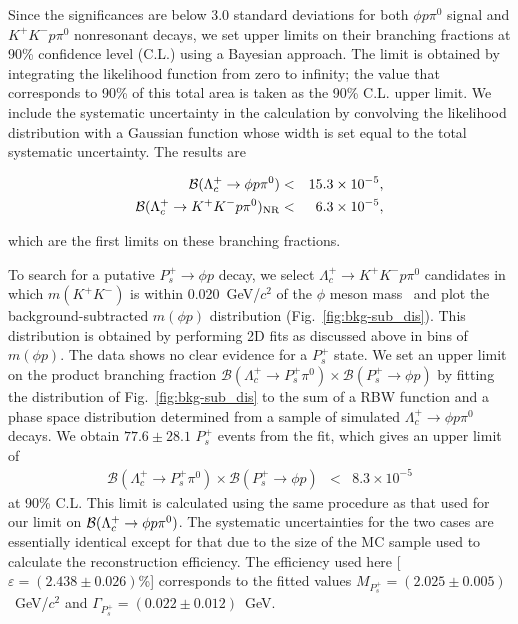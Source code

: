 \documentclass[aps,prl,twocolumn,superscriptaddress,showpacs,preprintnumbers,amsmath,amssymb]{revtex4-1}
\begin{document}
Since the significances are below 3.0 standard deviations for both $\phi p\pi^0$ signal and $K^+K^-p\pi^0$ nonresonant decays, we set upper limits on their branching fractions  at 90\% confidence level (C.L.) using a Bayesian approach. The limit is obtained by integrating the
likelihood function from zero to infinity; the value that
corresponds to 90\% of this total area is taken as the
90\% C.L. upper limit.  We include the systematic uncertainty  in the calculation by
convolving the likelihood distribution with a Gaussian function
whose width is set equal to the total systematic uncertainty. %
The results are
\begin{linenomath}
\begin{eqnarray*}
\mathcal{B}(\Lambda_c^+\to \phi p\pi^0) &<& 15.3\times10^{-5} ,\\
\mathcal{B}(\Lambda_c^+\to K^+K^-p\pi^0)_{\rm NR} &<&6.3\times10^{-5} ,
\end{eqnarray*}
\end{linenomath}
which are the first limits on these branching fractions. 

To search for a putative $P_s^+\to\phi p$ decay, we select $\Lambda_c^+\to K^+K^-p\pi^0$ candidates in which $m(K^+K^-)$ is within 0.020~GeV/$c^2$ of the   $\phi$ meson mass~\cite{PDG} 
and plot the  background-subtracted $m(\phi p)$ distribution (Fig.~\ref{fig:bkg-sub_dis}). This distribution is obtained by performing 2D fits as discussed above in bins of $m(\phi p)$. %
The data shows no clear evidence for a $P_s^+$ state. 
We set an upper limit on the product branching fraction 
$\mathcal{B}(\Lambda_c^+\to P_s^+\pi^0) \times \mathcal{B}(P_s^+\to \phi p)$ by fitting the  distribution of Fig.~\ref{fig:bkg-sub_dis}
to the sum of a RBW function and a phase space 
distribution determined from a sample of simulated $\Lambda^+_c\to\phi p\pi^0$ 
decays. We obtain $77.6\pm28.1$ $P_s^+$ events from the fit, which gives an upper limit of 
\begin{eqnarray*}
\mathcal{B}(\Lambda_c^+\to P_s^+\pi^0) \times 
\mathcal{B}(P_s^+\to \phi p) & < & 8.3\times 10^{-5}
\end{eqnarray*}
at 90\% C.L. This limit is calculated using the same procedure as that used for our limit on ${\cal B}(\Lambda_c^+\rightarrow \phi p \pi^0)$. The
systematic uncertainties for the two cases are essentially 
identical except for that due to the size of the MC sample 
used to calculate the reconstruction efficiency.
The  efficiency used here
[$\varepsilon=(2.438\pm 0.026)$\%] 
corresponds to the fitted values
$M_{P_s^+}=(2.025\pm 0.005)$~GeV/$c^2$ and 
$\Gamma_{P_s^+}=(0.022\pm 0.012)$~GeV. 
\end{document}
